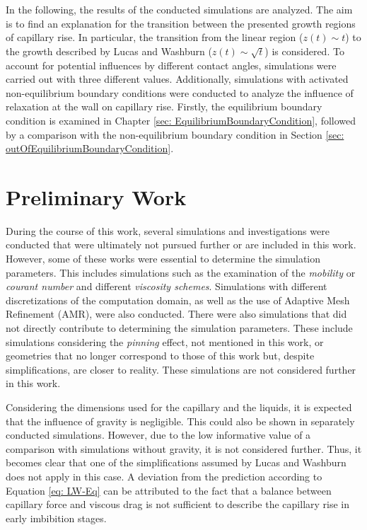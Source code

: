 In the following, the results of the conducted simulations are analyzed. The aim is to find an explanation for the transition between the presented growth regions of capillary rise. In particular, the transition from the linear region ($z(t)\sim t$) to the growth described by Lucas and Washburn ($z(t)\sim \sqrt{t}$) is considered. To account for potential influences by different contact angles, simulations were carried out with three different values. Additionally, simulations with activated non-equilibrium boundary conditions were conducted to analyze the influence of relaxation at the wall on capillary rise. Firstly, the equilibrium boundary condition is examined in Chapter \ref{sec: EquilibriumBoundaryCondition}, followed by a comparison with the non-equilibrium boundary condition in Section \ref{sec: outOfEquilibriumBoundaryCondition}.

\section{Preliminary Work}
During the course of this work, several simulations and investigations were conducted that were ultimately not pursued further or are included in this work. However, some of these works were essential to determine the simulation parameters. This includes simulations such as the examination of the \textit{mobility} or \textit{courant number} and different \textit{viscosity schemes}. Simulations with different discretizations of the computation domain, as well as the use of Adaptive Mesh Refinement (AMR), were also conducted. There were also simulations that did not directly contribute to determining the simulation parameters. These include simulations considering the \textit{pinning} effect, not mentioned in this work, or geometries that no longer correspond to those of this work but, despite simplifications, are closer to reality. These simulations are not considered further in this work.

Considering the dimensions used for the capillary and the liquids, it is expected that the influence of gravity is negligible. This could also be shown in separately conducted simulations. However, due to the low informative value of a comparison with simulations without gravity, it is not considered further. Thus, it becomes clear that one of the simplifications assumed by Lucas and Washburn does not apply in this case. A deviation from the prediction according to Equation \ref{eq: LW-Eq} can be attributed to the fact that a balance between capillary force and viscous drag is not sufficient to describe the capillary rise in early imbibition stages.

